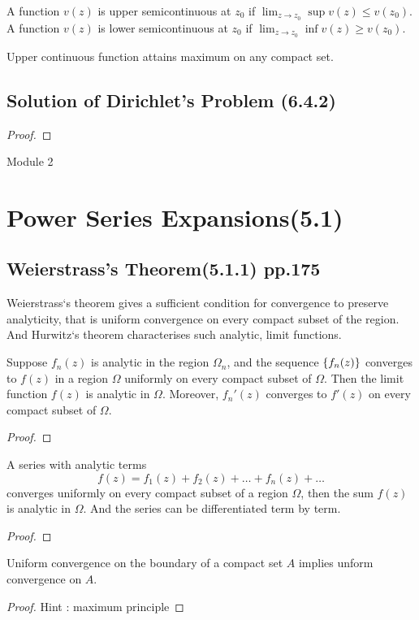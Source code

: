 \begin{definition}[semicontinuous]
	A function $v(z)$ is upper semicontinuous at $z_0$ if $\displaystyle \lim_{z \to z_0} \sup v(z) \le v(z_0)$.
	A function $v(z)$ is lower semicontinuous at $z_0$ if $\displaystyle \lim_{z \to z_0} \inf v(z) \ge v(z_0)$.
\end{definition}

\begin{remark}
	Upper continuous function attains maximum on any compact set.
\end{remark}

\subsection{Solution of Dirichlet's Problem (6.4.2)}
\begin{theorem}
\end{theorem}
\begin{proof}
\end{proof}
\pagebreak
{\Large Module 2}
\section{Power Series Expansions(5.1)}
\subsection{Weierstrass's Theorem(5.1.1) pp.175}
\begin{important}
	Weierstrass`s theorem gives a sufficient condition for convergence to preserve analyticity, that is uniform convergence on every compact subset of the region. 
	And Hurwitz`s theorem characterises such analytic, limit functions.
\end{important}
\begin{theorem}[Weierstrass]
	Suppose $f_n(z)$ is analytic in the region $\Omega_n$, and the sequence $\left\{f_n(z)\right\}$ converges to $f(z)$ in a region $\Omega$ uniformly on every compact subset of $\Omega$. Then the limit function $f(z)$ is analytic in $\Omega$. Moreover, $f_n'(z)$ converges to $f'(z)$ on every compact subset of $\Omega$.
\end{theorem}
\begin{proof}
\end{proof}

\begin{remark}
	A series with analytic terms
	\[ f(z) = f_1(z) + f_2(z) + \dots + f_n(z) + \dots \]
	converges uniformly on every compact subset of a region $\Omega$, then the sum $f(z)$ is analytic in $\Omega$. And the series can be differentiated term by term.
\end{remark}
\begin{proof}
\end{proof}
\begin{remark}
	Uniform convergence on the boundary of a compact set $A$ implies unform convergence on $A$.
\end{remark}
\begin{proof}
	Hint : maximum principle
\end{proof}

